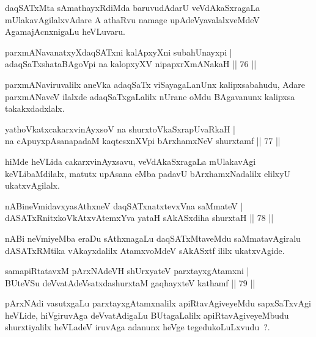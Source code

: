 \begin{artha}
daqSATxMta sAmathayxRdiMda baruvudAdarU veVdAkaSxragaLa mUlakavAgilalxvAdare A athaRvu namage upAdeVyavalalxveMdeV AgamajAcnxnigaLu heVLuvaru.
\end{artha}

\begin{shl}
parxmANavanatxyXdaqSATxni kalApxyXni subahUnayxpi |\\
adaqSaTxshataBAgoV\s pi na kalopxyXV nipapxrXmANakaH \hfill || 76 ||
\end{shl}

\begin{artha}
parxmANaviruvalilx aneVka adaqSaTx viSayagaLanUnx kalipxsabahudu, Adare parxmANaveV ilalxde adaqSaTxgaLalilx nUrane oMdu BAgavanunx kalipxsa takakxdadxlalx.
\end{artha}


\begin{shl}
yathoVkatxcakarxvinAyxsoV na shurxtoV\s kaSxrapUvaRkaH |\\
na cApuyxpAsanapadaM kaqtesxnXV\s pi bArxhamxNeV shurxtamf \hfill || 77 ||
\end{shl}

\begin{artha}
hiMde heVLida cakarxvinAyxsavu, veVdAkaSxragaLa mUlakavAgi keVLibaMdilalx, matutx upAsana eMba padavU bArxhamxNadalilx elilxyU ukatxvAgilalx.
\end{artha}

\begin{shl}
nABineVmidavxyasAthxneV daqSATxnatxtevxVna saMmateV |\\
dASATxRnitxkoVkAtxvAtemxYva yataH sAkASxdiha shurxtaH \hfill || 78 ||
\end{shl}

\begin{artha}
nABi neVmiyeMba eraDu sAthxnagaLu daqSATxMtaveMdu saMmatavAgiralu dASATxRMtika vAkayxdalilx AtamxvoMdeV sAkASxtf ililx ukatxvAgide.
\end{artha}

\begin{shl}
samapiRtatavxM pArxNAdeVH shUrxyateV parxtayxgAtamxni |\\
BUteVSu deVvatAdeVsatxdashurxtaM gaqhayxteV kathamf \hfill || 79 ||
\end{shl}

\begin{artha}
pArxNAdi vasutxgaLu parxtayxgAtamxnalilx apiRtavAgiveyeMdu sapxSaTxvAgi heVLide, hiVgiruvAga deVvatAdigaLu BUtagaLalilx apiRtavAgiveyeMbudu shurxtiyalilx heVLadeV iruvAga adanunx heVge tegedukoLuLxvudu~?.
\end{artha}


